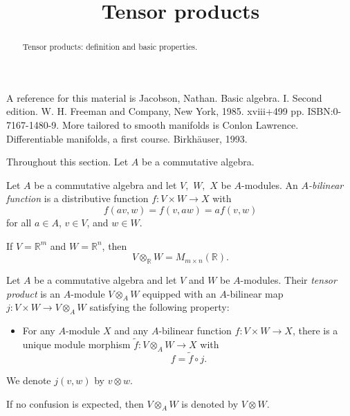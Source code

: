 \documentclass{ximera}
\title{Tensor products}
\begin{document}
    \begin{abstract} Tensor products: definition and basic properties.  \end{abstract}
    \maketitle


 A reference for this material is   Jacobson, Nathan.  Basic algebra. I. Second edition. W. H. Freeman and Company, New York, 1985. xviii+499 pp. ISBN:0-7167-1480-9. More tailored to smooth manifolds is Conlon Lawrence. Differentiable manifolds, a first course. Birkh\"auser, 1993.



    \begin{notation}
        Throughout this section. Let $A$ be a commutative algebra.
    \end{notation}


\begin{definition} 
Let $A$ be a commutative algebra and let $V,$ $ W,$ $ X$ be $A$-modules. An $A$\emph{-bilinear function} is a distributive function $f: V \times W \to X$ with 
\[ f(av,w) = f(v,aw)= af(v,w) \] 
for all $a \in A$, $v \in V$, and $w \in W$.  
\end{definition}

\begin{example}
    If $V = \mathbb{R}^m$ and $W = \mathbb{R}^n$, then 
    \[    V \otimes _{\mathbb{R}} W =   M_{m \times n}  (   \mathbb{R} )  .  \]
\end{example}


\begin{definition}
Let $A$ be a commutative algebra and let $V$ and $W$ be $A$-modules. Their \emph{tensor product} is an $A$-module $V \otimes _A W$ equipped with an $A$-bilinear map $j : V \times W \to V \otimes _A W$ satisfying the following property:
\begin{itemize}
    \item For any $A$-module $X$ and any $A$-bilinear function $f : V \times W \to X$, there is a unique module morphism $\tilde{f} : V \otimes _A W \to X$ with 
    \[     f = \tilde{f} \circ j     .     \]
\end{itemize}
We denote $j (v,w)$ by $v \otimes w$. 
\end{definition}


\begin{notation}
    If no confusion is expected, then $V \otimes _A W$ is denoted by $V \otimes W$.
\end{notation}
\end{document}
